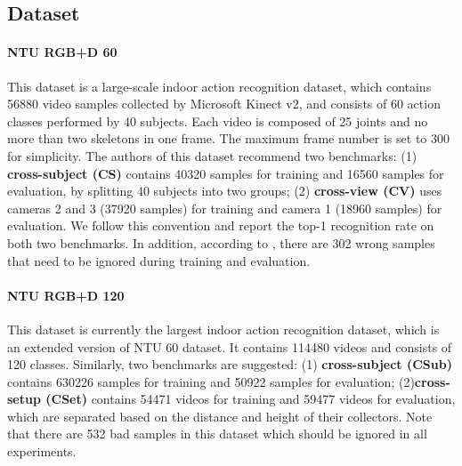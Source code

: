 \documentclass[journal]{IEEEtran}
\begin{document}
\subsection{Dataset}
\label{ssec:dataset}

\paragraph{NTU RGB+D 60 \cite{shahroudy2016ntu}} This dataset is a large-scale indoor action recognition dataset, which contains 56880 video samples collected by Microsoft Kinect v2, and consists of 60 action classes performed by 40 subjects. Each video is composed of 25 joints and no more than two skeletons in one frame. The maximum frame number  is set to 300 for simplicity. The authors of this dataset recommend two benchmarks:  (1) {\bf cross-subject (CS)} contains 40320 samples for training and 16560 samples for evaluation, by splitting 40 subjects into two groups; (2) {\bf cross-view (CV)} uses cameras 2 and 3 (37920 samples) for training and camera 1 (18960 samples) for evaluation. We follow this convention and report the top-1 recognition rate on both two benchmarks. In addition, according to \cite{lee2017ensemble}, there are 302 wrong samples that need to be ignored during training and evaluation.

\paragraph{NTU RGB+D 120 \cite{liu2019ntu}} This dataset is currently the largest indoor action recognition dataset, which is an extended version of NTU 60 dataset. It contains 114480 videos and consists of 120 classes. Similarly, two benchmarks are suggested: (1) {\bf cross-subject (CSub)} contains 630226 samples for training and 50922 samples for evaluation; (2){\bf cross-setup (CSet)} contains 54471 videos for training and 59477 videos for evaluation, which are separated based on the distance and height of their collectors. Note that there are 532 bad samples in this dataset which should be ignored in all experiments.
\end{document}
